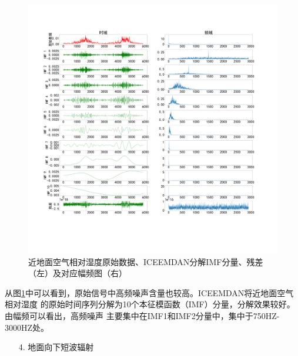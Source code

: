\documentclass[AutoFakeBold]{LZUThesis}
\begin{document}
\begin{figure}[H]
	\centering
    \includegraphics[width=1\textwidth]{figures/shum.pdf}
    \caption{近地面空气相对湿度原始数据、ICEEMDAN分解IMF分量、残差（左）及对应幅频图（右）}
    \label{fig_shum}
\end{figure}

从图\ref{fig_shum}中可以看到，原始信号中高频噪声含量也较高。ICEEMDAN将近地面空气相对湿度
的原始时间序列分解为10个本征模函数（IMF）分量，分解效果较好。由幅频可以看出，高频噪声
主要集中在IMF1和IMF2分量中，集中于750HZ-3000HZ处。

\begin{itemize}
    \item[4. ] 地面向下短波辐射
\end{itemize}
\end{document}
